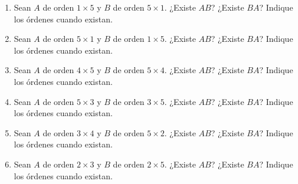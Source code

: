 \documentclass[12pt]{article}
\theoremstyle{remark}
\newcounter{contadorEjercicio}
\newenvironment{listaejercicios}{\begin{enumerate}[label=\textbf{E\arabic*.},leftmargin=2.4em,itemsep=0.52em]\setcounter{enumi}{\value{contadorEjercicio}}}{\setcounter{contadorEjercicio}{\value{enumi}}\end{enumerate}}
\begin{document}
\begin{listaejercicios}
\item Sean $A$ de orden $1\times5$ y $B$ de orden $5\times1$. ¿Existe $AB$? ¿Existe $BA$? Indique los órdenes cuando existan.

\item Sean $A$ de orden $5\times1$ y $B$ de orden $1\times5$. ¿Existe $AB$? ¿Existe $BA$? Indique los órdenes cuando existan.

\item Sean $A$ de orden $4\times5$ y $B$ de orden $5\times4$. ¿Existe $AB$? ¿Existe $BA$? Indique los órdenes cuando existan.

\item Sean $A$ de orden $5\times3$ y $B$ de orden $3\times5$. ¿Existe $AB$? ¿Existe $BA$? Indique los órdenes cuando existan.

\item Sean $A$ de orden $3\times4$ y $B$ de orden $5\times2$. ¿Existe $AB$? ¿Existe $BA$? Indique los órdenes cuando existan.

\item Sean $A$ de orden $2\times3$ y $B$ de orden $2\times5$. ¿Existe $AB$? ¿Existe $BA$? Indique los órdenes cuando existan.

\end{listaejercicios}
\end{document}
